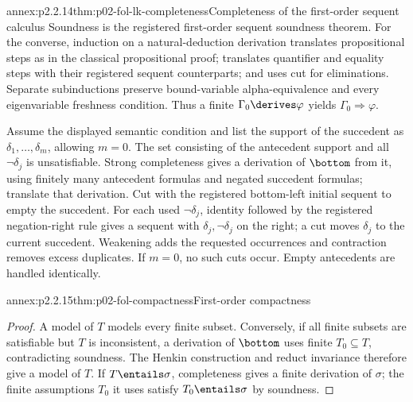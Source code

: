 \begin{annexitem}{annex:p2.2.14}{thm:p02-fol-lk-completeness}{Completeness of the first-order sequent calculus}
Soundness is the registered first-order sequent soundness theorem.  For the
converse, induction on a natural-deduction derivation translates propositional
steps as in the classical propositional proof; translates quantifier and
equality steps with their registered sequent counterparts; and uses cut for
eliminations.  Separate subinductions preserve bound-variable
alpha-equivalence and every eigenvariable freshness condition.  Thus a finite
\(\Gamma_0\derives\varphi\) yields
\(\Gamma_0\Rightarrow\varphi\).

Assume the displayed semantic condition and list the support of the succedent
as \(\delta_1,\ldots,\delta_m\), allowing \(m=0\).  The set consisting of
the antecedent support and all \(\neg\delta_j\) is unsatisfiable.  Strong
completeness gives a derivation of \(\bottom\) from it, using finitely many
antecedent formulas and negated succedent formulas; translate that derivation.
Cut with the registered bottom-left initial sequent to empty the succedent.
For each used \(\neg\delta_j\), identity followed by the registered
negation-right rule gives a sequent with \(\delta_j,\neg\delta_j\) on the
right; a cut moves \(\delta_j\) to the current succedent.  Weakening adds
the requested occurrences and contraction removes excess duplicates.
If \(m=0\), no such cuts occur.  Empty antecedents are handled identically.
\end{annexitem}

\begin{annexitem}{annex:p2.2.15}{thm:p02-fol-compactness}{First-order compactness}
\begin{proof}
A model of \(T\) models every finite subset.  Conversely, if all finite
subsets are satisfiable but \(T\) is inconsistent, a derivation of
\(\bottom\) uses finite \(T_0\subseteq T\), contradicting soundness.
The Henkin construction and reduct invariance therefore give a model of
\(T\).  If \(T\entails\sigma\), completeness gives a finite derivation of
\(\sigma\); the finite assumptions \(T_0\) it uses satisfy
\(T_0\entails\sigma\) by soundness.
\end{proof}
\end{annexitem}

